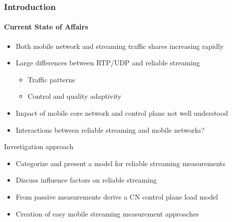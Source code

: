 \documentclass{beamer}
\begin{document}
\begin{frame}
	\frametitle{Introduction}
	\framesubtitle{Current State of Affairs}

	\begin{itemize}
		\item Both mobile network and streaming traffic shares increasing rapidly
		\item Large differences between RTP/UDP and reliable streaming
		\begin{itemize}
			\item Traffic patterns
			\item Control and quality adaptivity
		\end{itemize}
		\item Impact of mobile core network and control plane not well understood
		\item Interactions between reliable streaming and mobile networks?
	\end{itemize}

	\pause
	\begin{block}{Investigation approach}
	\begin{itemize}
		\item Categorize and present a model for reliable streaming measurements
		\item Discuss influence factors on reliable streaming
		\item From passive measurements derive a CN control plane load model
		\item Creation of easy mobile streaming measurement approaches
	\end{itemize}
	\end{block}
\end{frame}
\end{document}
